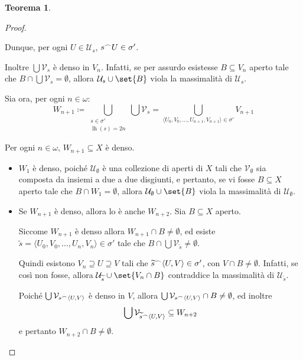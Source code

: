 \documentclass[titlepage]{article}
\newcommand{\1}{\mathds{1}}
\renewcommand{\tilde}[1]{\widetilde{#1}}
\newcommand{\concat}{\null^{\frown}} %
\theoremstyle{definition}%
\newtheorem{thm}{Teorema}[section]
\theoremstyle{plain}
\theoremstyle{remark}
\begin{document}
\begin{thm}
\begin{proof}
\begin{itemize}
Dunque, per ogni \(U \in \mathcal{U}_{s}\), \(s\concat U \in \sigma'\).

Inoltre \(\bigcup \mathcal{V}_{s}\) è denso in \(V_{n}\). Infatti, se per assurdo esistesse \(B \subseteq V_{n}\) aperto tale che \(B\cap \bigcup \mathcal{V}_{s} = \emptyset\), allora \(\mathcal{U}_{s}\cup \set{B}\) viola la massimalità di \(\mathcal{U}_{s}\).
\end{itemize}

Sia ora, per ogni \(n \in\omega\):
\begin{equation*}
W_{n+1} \coloneqq \bigcup_{\substack{s \in \sigma'\\
\operatorname{lh}(s) = 2n}} \bigcup \mathcal{V}_{s} = \bigcup_{\langle U_{0},V_{0},\dots, U_{n+1}, V_{n+1}\rangle \in \sigma'} V_{n+1}
\end{equation*}

Per ogni \(n \in \omega\), \(W_{n+1} \subseteq X\) è denso.
\begin{itemize}
\item \(W_{1}\) è denso, poiché \(\mathcal{U}_{\emptyset}\) è una collezione di aperti di \(X\) tali che \(\mathcal{V}_{\emptyset}\) sia composta da insiemi a due a due disgiunti, e pertanto, se vi fosse \(B \subseteq X\) aperto tale che \(B\cap W_{1} = \emptyset\), allora \(\mathcal{U}_{\emptyset}\cup\set{B}\) viola la massimalità di \(\mathcal{U}_{\emptyset}\).
\item Se \(W_{n+1}\) è denso, allora lo è anche \(W_{n+2}\). Sia \(B \subseteq X\) aperto.

Siccome \(W_{n+1}\) è denso allora \(W_{n+1}\cap B\neq \emptyset\), ed esiste \(\tilde{s} = \langle U_{0},V_{0},\dots,U_{n}, V_{n}\rangle \in \sigma'\) tale che \(B\cap\bigcup \mathcal{V}_{\tilde{s}} \neq \emptyset\).

Quindi esistono \(V_{n}\supseteq U \supseteq V\) tali che \(\tilde{s}\concat \langle U, V\rangle \in \sigma'\), con \(V\cap B\neq \emptyset\). Infatti, se così non fosse, allora \(\mathcal{U}_{\tilde{s}}\cup\set{V_{n}\cap B}\) contraddice la massimalità di \(\mathcal{U}_{\tilde{s}}\).

Poiché \(\bigcup \mathcal{V}_{s\concat \langle U, V\rangle}\) è denso in \(V\), allora \(\bigcup \mathcal{V}_{s\concat \langle U, V\rangle} \cap B \neq \emptyset\), ed inoltre
\begin{equation*}
  \bigcup \mathcal{V}_{\tilde{s}\concat \langle U, V\rangle} \subseteq W_{n+2}
\end{equation*}
e pertanto \(W_{n+2}\cap B\neq \emptyset\).
\end{itemize}


\end{proof}
\end{thm}
\end{document}
